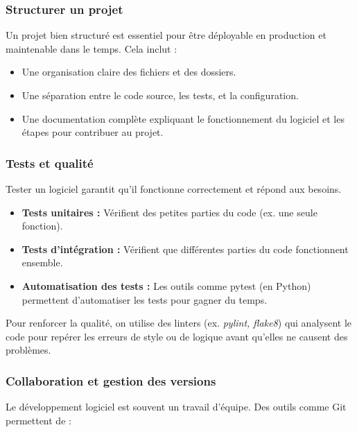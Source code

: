 \documentclass[
  letterpaper,
  DIV=11,
  numbers=noendperiod]{scrartcl}
\providecommand{\tightlist}{%
  \setlength{\itemsep}{0pt}\setlength{\parskip}{0pt}}\usepackage{longtable,booktabs,array}
\begin{document}
\subsubsection{Structurer un projet}\label{structurer-un-projet}

Un projet bien structuré est essentiel pour être déployable en
production et maintenable dans le temps. Cela inclut :

\begin{itemize}
\item
  Une organisation claire des fichiers et des dossiers.
\item
  Une séparation entre le code source, les tests, et la configuration.
\item
  Une documentation complète expliquant le fonctionnement du logiciel et
  les étapes pour contribuer au projet.
\end{itemize}

\subsubsection{Tests et qualité}\label{tests-et-qualituxe9}

Tester un logiciel garantit qu'il fonctionne correctement et répond aux
besoins.

\begin{itemize}
\tightlist
\item
  \textbf{Tests unitaires :} Vérifient des petites parties du code (ex.
  une seule fonction).
\item
  \textbf{Tests d'intégration :} Vérifient que différentes parties du
  code fonctionnent ensemble.
\item
  \textbf{Automatisation des tests :} Les outils comme pytest (en
  Python) permettent d'automatiser les tests pour gagner du temps.
\end{itemize}

Pour renforcer la qualité, on utilise des linters (ex. \emph{pylint,
flake8}) qui analysent le code pour repérer les erreurs de style ou de
logique avant qu'elles ne causent des problèmes.

\subsubsection{Collaboration et gestion des
versions}\label{collaboration-et-gestion-des-versions}

Le développement logiciel est souvent un travail d'équipe. Des outils
comme Git permettent de :
\end{document}
